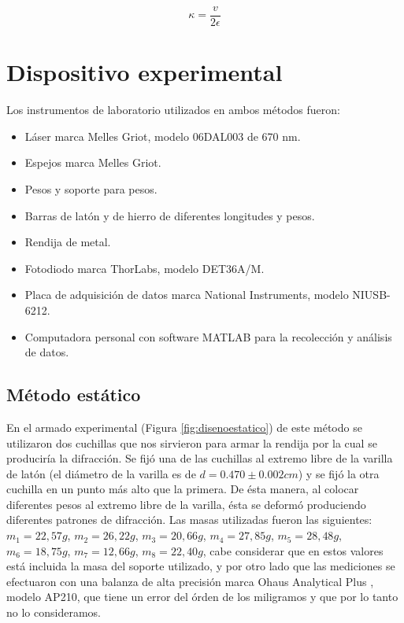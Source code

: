 \documentclass[twoside,twocolumn,a4paper]{article}
\begin{document}
\begin{equation}
\label{eq:kappa}
\kappa = \frac{v}{2\epsilon}
\end{equation}


\section{Dispositivo experimental}

Los instrumentos de laboratorio utilizados en ambos m\'etodos fueron:
\begin{itemize}
\item 
\label{Laser} L\'aser marca Melles Griot, modelo 06DAL003 de 670 nm.
\item Espejos marca Melles Griot.
\item Pesos y soporte para pesos.
\item Barras de lat\'on y de hierro de diferentes longitudes y pesos.
\item Rendija de metal.
\item Fotodiodo marca ThorLabs, modelo DET36A/M.
\item Placa de adquisici\'on de datos marca National Instruments, modelo NIUSB-6212.
\item Computadora personal con software MATLAB para la recolecci\'on y an\'alisis de datos.
\end{itemize}

\subsection{M\'etodo est\'atico}

En el armado experimental (Figura \ref{fig:disenoestatico}) de este m\'etodo se utilizaron dos cuchillas que nos sirvieron para armar la rendija por la cual se producir\'ia la difracci\'on. Se fij\'o una de las cuchillas al extremo libre de la varilla de lat\'on (el di\'ametro de la varilla es de $d = 0.470 \pm 0.002cm$) y se fij\'o la otra cuchilla en un punto m\'as alto que la primera. De \'esta manera, al colocar diferentes pesos al extremo libre de la varilla, \'esta se deform\'o produciendo diferentes patrones de difracci\'on. Las masas utilizadas fueron las siguientes: $m_{1} = 22,57 g$, $m_{2} = 26,22 g$, $m_{3} = 20,66 g$, $m_{4} = 27,85 g$, $m_{5} = 28,48 g$, $m_{6} = 18,75 g$, $m_{7} = 12,66 g$, $m_{8} = 22,40 g$, cabe considerar que en estos valores est\'a incluida la masa del soporte utilizado, y por otro lado que las mediciones se efectuaron con una balanza de alta precisi\'on marca Ohaus Analytical Plus , modelo AP210, que tiene un error del \'orden de los miligramos y que por lo tanto no lo consideramos. \newline
\end{document}
